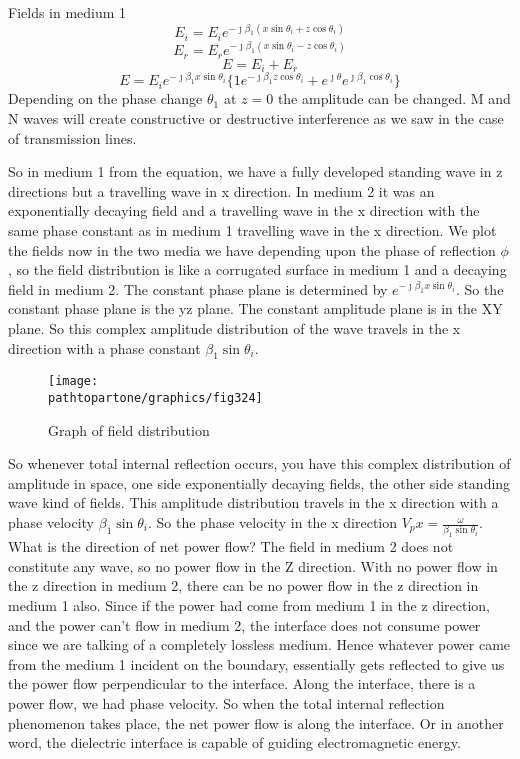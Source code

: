 Fields in medium 1
\begin{equation}
E_i = E_i e^{- \jmath \beta_1(x\sin\theta_i + z\cos\theta_i)}
\end{equation}
\begin{equation}
E_r = E_r e^{- \jmath \beta_1(x\sin\theta_i - z\cos\theta_i)}
\end{equation}
\begin{equation*}
E = E_i + E_r
\end{equation*}
\begin{equation*}
E = E_i e^{- \jmath \beta_1x\sin\theta_i}\{ 1e^{- \jmath \beta_1z\cos\theta_i} + e^{\jmath \theta}
e^{\jmath \beta_1\cos\theta_i} \}
\end{equation*}
Depending on the phase change $\theta_1$ at $z = 0$ the amplitude can be changed. M and N waves will create constructive or destructive interference as we saw in the case of transmission lines. 

So in medium 1 from the equation, we have a fully developed standing wave in z directions but a travelling wave in x direction. In medium 2 it was an exponentially decaying field and a travelling wave in the x direction with the same phase constant as in medium 1 travelling wave in the x direction. We plot the fields now in the two media we have depending upon the phase of reflection $\phi$, so the field distribution is like a corrugated surface in medium 1 and a decaying field in medium 2. The constant phase plane is determined by $e^{- \jmath \beta_1x\sin\theta_i}$. So the constant phase plane is the yz plane. The constant amplitude plane is in the XY plane. So this complex amplitude distribution of the wave travels in the x direction with a phase constant $\beta_1\sin\theta_i$.
\begin{figure}[h]
\centering
\texttt{[image: \\pathtopartone/graphics/fig324]}
\caption{Graph of field distribution}
\end{figure}

So whenever total internal reflection occurs, you have this complex distribution of amplitude in space, one side exponentially decaying fields, the other side standing wave kind of fields. This amplitude distribution travels in the x direction with a phase velocity $\beta_1\sin\theta_i$. So the phase velocity in the x direction $V_px = \frac{\omega}{\beta_1\sin\theta_i}$. What is the direction of net power flow? The field in medium 2 does not constitute any wave, so no power flow in the Z direction. With no power flow in the z direction in medium 2, there can be no power flow in the z direction in medium 1 also. Since if the power had come from medium 1 in the z direction, and the power can't flow in medium 2, the interface does not consume power since we are talking of a completely lossless medium. Hence whatever power came from the medium 1 incident on the boundary, essentially gets reflected to give us the power flow perpendicular to the interface. Along the interface, there is a power flow, we had phase velocity. So when the total internal reflection phenomenon takes place, the net power flow is along the interface. Or in another word, the dielectric interface is capable of guiding electromagnetic energy.

